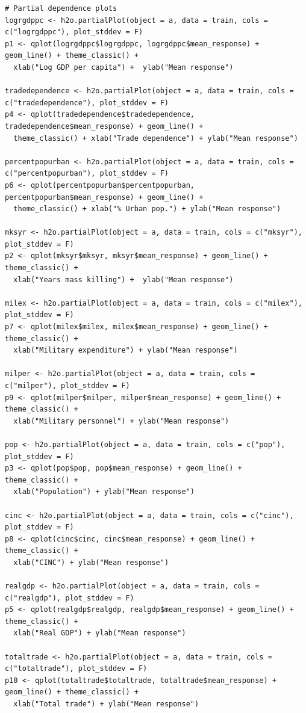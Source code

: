 \begin{verbatim}
# Partial dependence plots
logrgdppc <- h2o.partialPlot(object = a, data = train, cols = c("logrgdppc"), plot_stddev = F)
p1 <- qplot(logrgdppc$logrgdppc, logrgdppc$mean_response) + geom_line() + theme_classic() +
  xlab("Log GDP per capita") +  ylab("Mean response")

tradedependence <- h2o.partialPlot(object = a, data = train, cols = c("tradedependence"), plot_stddev = F)
p4 <- qplot(tradedependence$tradedependence, tradedependence$mean_response) + geom_line() +
  theme_classic() + xlab("Trade dependence") + ylab("Mean response")

percentpopurban <- h2o.partialPlot(object = a, data = train, cols = c("percentpopurban"), plot_stddev = F)
p6 <- qplot(percentpopurban$percentpopurban, percentpopurban$mean_response) + geom_line() +
  theme_classic() + xlab("% Urban pop.") + ylab("Mean response")

mksyr <- h2o.partialPlot(object = a, data = train, cols = c("mksyr"), plot_stddev = F)
p2 <- qplot(mksyr$mksyr, mksyr$mean_response) + geom_line() + theme_classic() +
  xlab("Years mass killing") +  ylab("Mean response")

milex <- h2o.partialPlot(object = a, data = train, cols = c("milex"), plot_stddev = F)
p7 <- qplot(milex$milex, milex$mean_response) + geom_line() + theme_classic() +
  xlab("Military expenditure") + ylab("Mean response")

milper <- h2o.partialPlot(object = a, data = train, cols = c("milper"), plot_stddev = F)
p9 <- qplot(milper$milper, milper$mean_response) + geom_line() + theme_classic() +
  xlab("Military personnel") + ylab("Mean response")

pop <- h2o.partialPlot(object = a, data = train, cols = c("pop"), plot_stddev = F)
p3 <- qplot(pop$pop, pop$mean_response) + geom_line() + theme_classic() +
  xlab("Population") + ylab("Mean response")

cinc <- h2o.partialPlot(object = a, data = train, cols = c("cinc"), plot_stddev = F)
p8 <- qplot(cinc$cinc, cinc$mean_response) + geom_line() + theme_classic() +
  xlab("CINC") + ylab("Mean response")

realgdp <- h2o.partialPlot(object = a, data = train, cols = c("realgdp"), plot_stddev = F)
p5 <- qplot(realgdp$realgdp, realgdp$mean_response) + geom_line() + theme_classic() +
  xlab("Real GDP") + ylab("Mean response")

totaltrade <- h2o.partialPlot(object = a, data = train, cols = c("totaltrade"), plot_stddev = F)
p10 <- qplot(totaltrade$totaltrade, totaltrade$mean_response) + geom_line() + theme_classic() +
  xlab("Total trade") + ylab("Mean response")


\end{verbatim}
